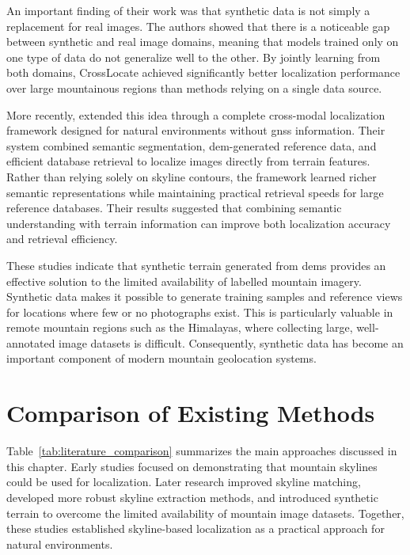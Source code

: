An important finding of their work was that synthetic data is not simply a replacement for real images. The authors showed that there is a noticeable gap between synthetic and real image domains, meaning that models trained only on one type of data do not generalize well to the other. By jointly learning from both domains, CrossLocate achieved significantly better localization performance over large mountainous regions than methods relying on a single data source.

More recently, \cite{liu2023cmlocate} extended this idea through a complete cross-modal localization framework designed for natural environments without \Gls{gnss} information. Their system combined semantic segmentation, \Gls{dem}-generated reference data, and efficient database retrieval to localize images directly from terrain features. Rather than relying solely on skyline contours, the framework learned richer semantic representations while maintaining practical retrieval speeds for large reference databases. Their results suggested that combining semantic understanding with terrain information can improve both localization accuracy and retrieval efficiency.

These studies indicate that synthetic terrain generated from \Glspl{dem} provides an effective solution to the limited availability of labelled mountain imagery. Synthetic data makes it possible to generate training samples and reference views for locations where few or no photographs exist. This is particularly valuable in remote mountain regions such as the Himalayas, where collecting large, well-annotated image datasets is difficult. Consequently, synthetic data has become an important component of modern mountain geolocation systems.

\section{Comparison of Existing Methods}

Table~\ref{tab:literature_comparison} summarizes the main approaches discussed in this chapter. Early studies focused on demonstrating that mountain skylines could be used for localization. Later research improved skyline matching, developed more robust skyline extraction methods, and introduced synthetic terrain to overcome the limited availability of mountain image datasets. Together, these studies established skyline-based localization as a practical approach for natural environments.

